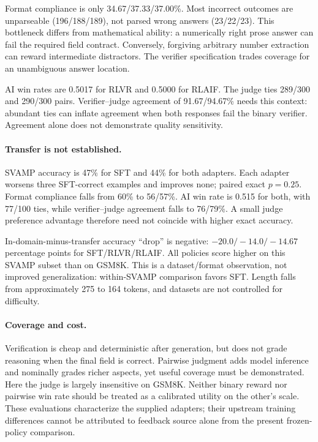 \documentclass{article}
\begin{document}
Format compliance is only 34.67/37.33/37.00\%. Most incorrect outcomes are unparseable (196/188/189), not parsed wrong answers (23/22/23). This bottleneck differs from mathematical ability: a numerically right prose answer can fail the required field contract. Conversely, forgiving arbitrary number extraction can reward intermediate distractors. The verifier specification trades coverage for an unambiguous answer location.

AI win rates are 0.5017 for RLVR and 0.5000 for RLAIF. The judge ties 289/300 and 290/300 pairs. Verifier--judge agreement of 91.67/94.67\% needs this context: abundant ties can inflate agreement when both responses fail the binary verifier. Agreement alone does not demonstrate quality sensitivity.

\paragraph{Transfer is not established.} SVAMP accuracy is 47\% for SFT and 44\% for both adapters. Each adapter worsens three SFT-correct examples and improves none; paired exact $p=0.25$. Format compliance falls from 60\% to 56/57\%. AI win rate is 0.515 for both, with 77/100 ties, while verifier--judge agreement falls to 76/79\%. A small judge preference advantage therefore need not coincide with higher exact accuracy.

In-domain-minus-transfer accuracy ``drop'' is negative: $-20.0/-14.0/-14.67$ percentage points for SFT/RLVR/RLAIF. All policies score higher on this SVAMP subset than on GSM8K. This is a dataset/format observation, not improved generalization: within-SVAMP comparison favors SFT. Length falls from approximately 275 to 164 tokens, and datasets are not controlled for difficulty.

\paragraph{Coverage and cost.} Verification is cheap and deterministic after generation, but does not grade reasoning when the final field is correct. Pairwise judgment adds model inference and nominally grades richer aspects, yet useful coverage must be demonstrated. Here the judge is largely insensitive on GSM8K. Neither binary reward nor pairwise win rate should be treated as a calibrated utility on the other's scale. These evaluations characterize the supplied adapters; their upstream training differences cannot be attributed to feedback source alone from the present frozen-policy comparison.
\clearpage
\end{document}
